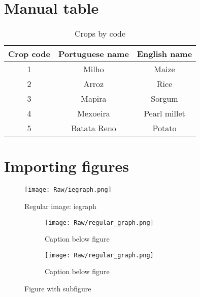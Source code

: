 \documentclass{article}
\begin{document}
 \section{Manual table}

\begin{table}[h!]                                                                       %
	\caption{Crops by code}                                                             %
	\centering                                                                          %
	\begin{tabular}{ccc}
		\hline\hline
		\textbf{Crop code} & \textbf{Portuguese name} & \textbf{English name} \\
		\hline
		1 &	Milho & Maize \\
		2 &	Arroz & Rice\\
		3 &	Mapira & Sorgum\\
		4 &	Mexoeira & Pearl millet\\
		5 &	Batata Reno & Potato \\
		\hline\hline
	\end{tabular}
\end{table}

\section{Importing figures}

	 \begin{figure}[H]
		\centering
		\texttt{[image: Raw/iegraph.png]}
		\caption{Regular image: iegraph}  	%
		\label{fig:my_label}                %
	\end{figure}
	
	\begin{figure}[H]
	\centering
	\begin{subfigure}[b]{0.49\textwidth}                                  %
		\texttt{[image: Raw/regular\_graph.png]}   
		\caption{Caption below figure}                                      %
	\end{subfigure}
	\begin{subfigure}[b]{0.49\textwidth}                                  %
		\texttt{[image: Raw/regular\_graph.png]}    %
		\caption{Caption below figure}                                              %
	\end{subfigure}
	\caption{Figure with subfigure}
\end{figure}
\end{document}
